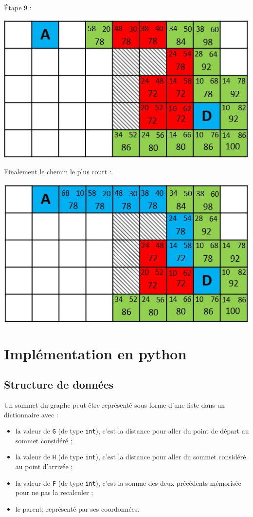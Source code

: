 \newpage
\'Etape 9 :
\begin{center}
\includegraphics[scale=0.8]{images/quadri11.jpg}
\end{center}

Finalement le chemin le plus court :
\begin{center}
\includegraphics[scale=0.8]{images/quadrifinal.jpg}
\end{center}

\section{Implémentation en python}

\subsection{Structure de données}

Un sommet du graphe peut être représenté sous forme d'une liste dans un dictionnaire avec :
\begin{itemize}
\item la valeur de \texttt{G} (de type \texttt{int}), c'est la distance pour aller du point de départ au sommet considéré ;
\item la valeur de \texttt{H} (de type \texttt{int}), c'est la distance pour aller du sommet considéré au point d'arrivée ;
\item la valeur de \texttt{F} (de type \texttt{int}), c'est la somme des deux précédents mémorisée pour ne pas la recalculer ;
\item le parent, représenté par ses coordonnées.
\end{itemize}

